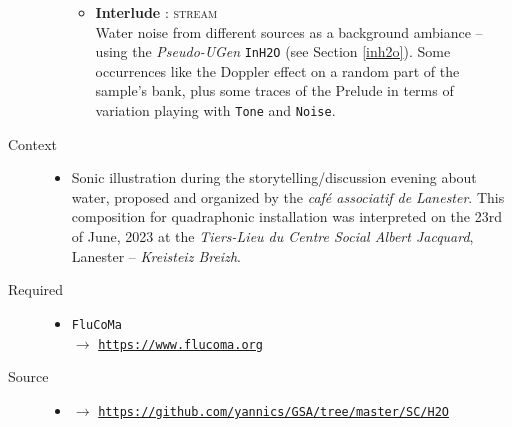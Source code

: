\begin{description}
\begin{itemize}
\begin{itemize}[leftmargin=0.4in]
		\item \textbf{Interlude} : \textsc{stream} \\ Water noise from different sources as a background ambiance -- using the \textit{Pseudo-UGen} \texttt{InH2O} (see Section \ref{inh2o}). Some occurrences like the Doppler effect on a random part of the sample's bank, plus some traces of the Prelude in terms of variation playing with \texttt{Tone} and \texttt{Noise}.
		\end{itemize}
	\end{itemize}

\item[Context] \hfill 
	\begin{itemize}
	\item[] Sonic illustration during the storytelling/discussion evening about water, proposed and organized by the \textit{café associatif de Lanester}. This composition for quadraphonic installation was interpreted on the 23rd of June, 2023 at the \textit{Tiers-Lieu du Centre Social Albert Jacquard}, Lanester -- \textit{Kreisteiz Breizh}.
	\end{itemize}

\item[Required] \hfill 
\begin{itemize}
\setlength\itemsep{1em}
\item[] \texttt{FluCoMa} \\ $\rightarrow$ \href{https://www.flucoma.org}{\texttt{\small https://www.flucoma.org}}
\end{itemize}

\item[Source] \hfill 
\begin{itemize}
\item[] $\rightarrow$ \href{https://github.com/yannics/GSA/tree/master/SC/H2O}{\texttt{\small https://github.com/yannics/GSA/tree/master/SC/H2O}}  
\end{itemize}


\end{description}
